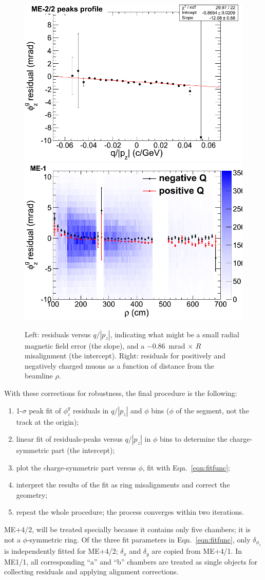 \documentclass[12pt]{article}
\begin{document}
\begin{figure}
\includegraphics[height=6 cm]{charge_decomposition.png} \hfill
\includegraphics[height=6 cm]{charge_decomposition2.png}

\caption{Left: residuals versus $q/|p_z|$, indicating what might be a
  small radial magnetic field error (the slope), and a $-0.86$~mrad
  $\times$ $R$ misalignment (the intercept).  Right: residuals for
  positively and negatively charged muons as a function of distance
  from the beamline $\rho$. \label{fig:charge_decomposition}}
\end{figure}

With these corrections for robustness, the final procedure is the
following:
\begin{enumerate}
\item 1-$\sigma$ peak fit of $\phi^g_z$ residuals in $q/|p_z|$ and
  $\phi$ bins ($\phi$ of the segment, not the track at the origin);
\item linear fit of residuals-peaks versus $q/|p_z|$ in $\phi$ bins to
  determine the charge-symmetric part (the intercept);
\item plot the charge-symmetric part versus $\phi$, fit with
  Eqn.~\ref{eqn:fitfunc};
\item interpret the results of the fit as ring misalignments and
  correct the geometry;
\item repeat the whole procedure; the process converges within two
  iterations.
\end{enumerate}
ME$+$4/2, will be treated specially because it contains only five
chambers; it is not a $\phi$-symmetric ring.  Of the three fit
parameters in Eqn.~\ref{eqn:fitfunc}, only $\delta_{\phi_z}$ is
independently fitted for ME$+$4/2; $\delta_x$ and $\delta_y$ are
copied from ME$+$4/1.  In ME1/1, all corresponding ``a'' and ``b''
chambers are treated as single objects for collecting residuals and
applying alignment corrections.
\end{document}
